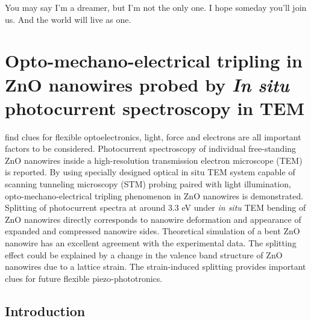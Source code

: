 
\begin{savequote}[75mm] 
You may say I'm a dreamer, but I'm not the only one. I hope someday you'll join us. And the world will live as one.
\end{savequote}

\chapter{Opto-mechano-electrical tripling in ZnO nanowires probed by \emph{In situ} photocurrent spectroscopy in TEM}

 find clues for flexible optoelectronics, light, force and electrons are all important factors to be considered. Photocurrent spectroscopy of individual free-standing ZnO nanowires inside a high-resolution transmission electron microscope (TEM) is reported. By using specially designed optical in situ TEM system capable of scanning tunneling microscopy (STM) probing paired with light illumination, opto-mechano-electrical tripling phenomenon in ZnO nanowires is demonstrated. Splitting of photocurrent spectra at around 3.3 eV under {\em in situ} TEM bending of ZnO nanowires directly corresponds to nanowire deformation and appearance of expanded and compressed nanowire sides. Theoretical simulation of a bent ZnO nanowire has an excellent agreement with the experimental data. The splitting effect could be explained by a change in the valence band structure of ZnO nanowires due to a lattice strain. The strain-induced splitting provides important clues for future flexible piezo-phototronics. 

\section{Introduction}

